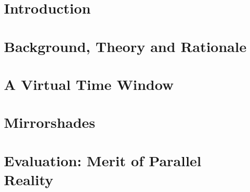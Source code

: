 \documentclass[a4paper]{report}
\begin{document}

\listoffigures


\listoftables


\chapter{Introduction}
\graphicspath{ {06_mirrorshades_studies_results/images/} }



%


\chapter{Background, Theory and Rationale}
\graphicspath{ {03_background/images/} }

%


\chapter{A Virtual Time Window}
\graphicspath{ {04_vtw/images/} }



\chapter{Mirrorshades}
\graphicspath{ {05_mirrorshades_design_implementation/images/} }



\chapter{Evaluation: Merit of Parallel Reality}
\graphicspath{ {06_mirrorshades_studies_results/images/} }

\end{document}
